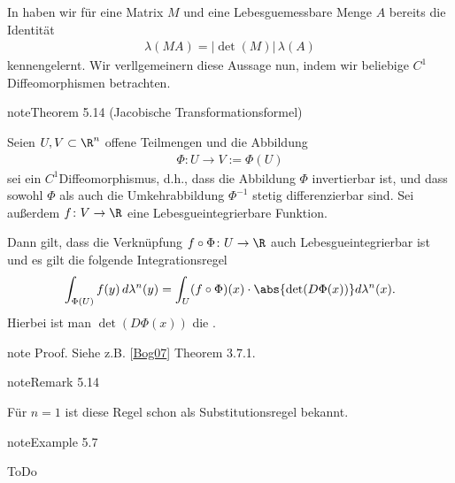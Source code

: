 \documentclass[letterpaper,10pt,german]{jupyterBook}
\begin{document}
\sphinxAtStartPar
In {\hyperref[\detokenize{masstheorie/masstheorie:rem:transinvariance}]{}} haben wir für eine Matrix \(M\) und eine Lebesgue\sphinxhyphen{}messbare Menge \(A\) bereits die Identität
\begin{equation*}
\begin{split}\lambda(MA) = |\det(M)| \, \lambda(A)\end{split}
\end{equation*}
\sphinxAtStartPar
kennengelernt. Wir verllgemeinern diese Aussage nun, indem wir beliebige \(C^1\)\sphinxhyphen{}Diffeomorphismen betrachten.
\label{masstheorie/integrationstechnik:thm:jacobitransformation}
\begin{sphinxadmonition}{note}{Theorem 5.14 (Jacobische Transformationsformel)}



\sphinxAtStartPar
Seien \(U, V \subset \R^n\) offene Teilmengen und die Abbildung
\begin{equation*}
\begin{split}\Phi \colon U \rightarrow V := \Phi(U)\end{split}
\end{equation*}
\sphinxAtStartPar
sei ein \(C^1\)\sphinxhyphen{}Diffeomorphismus, d.h., dass die Abbildung \(\Phi\) invertierbar ist, und dass sowohl \(\Phi\) als auch die Umkehrabbildung \(\Phi^{-1}\) stetig differenzierbar sind.
Sei außerdem \(f \colon V \rightarrow \R\) eine Lebesgue\sphinxhyphen{}integrierbare Funktion.

\sphinxAtStartPar
Dann gilt, dass die Verknüpfung \(f \circ \Phi \colon U \rightarrow \R\) auch Lebesgue\sphinxhyphen{}integrierbar ist und es gilt die folgende Integrationsregel
\begin{equation*}
\begin{split}\int_{\Phi(U)} f(y)\,d\lambda^n(y) = \int_U (f \circ \Phi)(x) \cdot \abs{\det(D\Phi(x))} d\lambda^n(x). \end{split}
\end{equation*}
\sphinxAtStartPar
Hierbei ist man \(\det(D\Phi(x))\) die .
\end{sphinxadmonition}

\begin{sphinxadmonition}{note}
\sphinxAtStartPar
Proof. Siehe z.B. {[}\hyperlink{cite.references:id5}{Bog07}{]} Theorem 3.7.1.
\end{sphinxadmonition}
\label{masstheorie/integrationstechnik:remark-25}
\begin{sphinxadmonition}{note}{Remark 5.14}



\sphinxAtStartPar
Für \(n=1\) ist diese Regel schon als Substitutionsregel bekannt.
\end{sphinxadmonition}
\label{masstheorie/integrationstechnik:example-26}
\begin{sphinxadmonition}{note}{Example 5.7}



\sphinxAtStartPar
ToDo
\end{sphinxadmonition}
\end{document}
